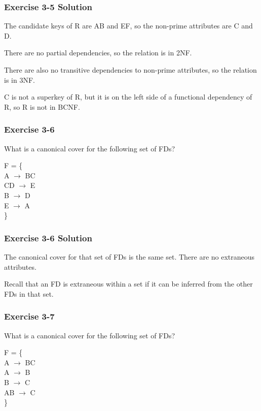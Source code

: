 \begin{frame}
\frametitle{Exercise 3-5 Solution}

The candidate keys of R are AB and EF, so the non-prime attributes are C and D.

There are no partial dependencies, so the relation is in 2NF.

There are also no transitive dependencies to non-prime attributes, so the relation is in 3NF.

C is not a superkey of R, but it is on the left side of a functional dependency of R, so R is not in BCNF.

\end{frame}


\begin{frame}
\frametitle{Exercise 3-6}

What is a canonical cover for the following set of FDs?

F = \{ \\
  A $\rightarrow$ BC\\
  CD $\rightarrow$ E\\
  B $\rightarrow$ D\\
  E $\rightarrow$ A\\
\}

\end{frame}


\begin{frame}
\frametitle{Exercise 3-6 Solution}

The canonical cover for that set of FDs is the same set. There are no extraneous attributes.

Recall that an FD is extraneous within a set if it can be inferred from the other FDs in that set.

\end{frame}


\begin{frame}
\frametitle{Exercise 3-7}

What is a canonical cover for the following set of FDs?

F = \{ \\
  A $\rightarrow$ BC\\
  A $\rightarrow$ B\\
  B $\rightarrow$ C\\
  AB $\rightarrow$ C\\
\}

\end{frame}

